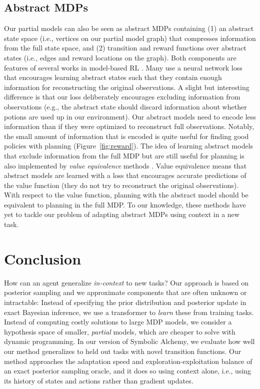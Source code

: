\documentclass[sigconf]{aamas}
\begin{document}
\subsection{Abstract MDPs} Our partial models can also be seen as abstract MDPs containing (1) an abstract state space (i.e., vertices on our partial model graph) that compresses information from the full state space, and (2) transition and reward functions over abstract states (i.e., edges and reward locations on the graph). Both components are features of several works in model-based RL \cite{moerlandModelbasedReinforcementLearning2022,haWorldModels2018}. Many use a neural network loss that encourages learning abstract states such that they contain enough information for reconstructing the original observations. A slight but interesting difference is that our loss deliberately encourages excluding information from observations (e.g., the abstract state should discard information about whether potions are used up in our environment). Our abstract models need to encode less information than if they were optimized to reconstruct full observations. Notably, the small amount of information that is encoded is quite useful for finding good policies with planning (Figure~\ref{fig:reward}).
The idea of learning abstract models that exclude information from the full MDP but are still useful for planning is also implemented by \textit{value equivalence} methods \citep[e.g.,][]{schrittwieserMasteringAtariGo2020,silverPredictronEndToEndLearning2017,ohValuePredictionNetwork2017,farquharTreeQNATreeCDifferentiable2018,tamarValueIterationNetworks2016}. Value equivalence means that abstract models are learned with a loss that encourages accurate predictions of the value function (they do not try to reconstruct the original observations). With respect to the value function, planning with the abstract model should be equivalent to planning in the full MDP. To our knowledge, these methods have yet to tackle our problem of adapting abstract MDPs using context in a new task.
\section{Conclusion}\label{sec:conc}
How can an agent generalize \textit{in-context} to new tasks? Our approach is based on posterior sampling \cite{thompsonLikelihoodThatOne1933,strensBayesianFrameworkReinforcement2000,osbandMoreEfficientReinforcement2013} and we approximate components that are often unknown or intractable: Instead of specifying the prior distribution and posterior update in exact Bayesian inference, we use a transformer to \textit{learn} these from training tasks. Instead of computing costly solutions to large MDP models, we consider a hypothesis space of smaller, \textit{partial} models, which are cheaper to solve with dynamic programming. In our version of Symbolic Alchemy, we evaluate how well our method generalizes to held out tasks with novel transition functions. Our method approaches the adaptation speed and exploration-exploitation balance of an exact posterior sampling oracle, and it does so using context alone, i.e., using its history of states and actions rather than gradient updates.
\end{document}

